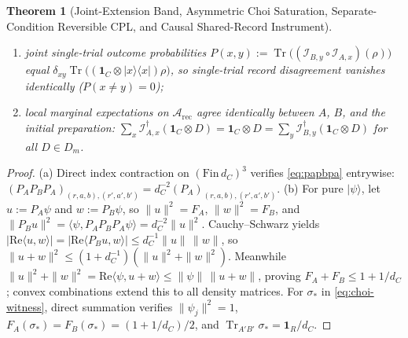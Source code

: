 \documentclass[11pt,a4paper]{article}
\newtheorem{theorem}{Theorem}
\theoremstyle{definition}
\theoremstyle{remark}
\newcommand{\Tr}{\operatorname{Tr}}
\newcommand{\cA}{\mathcal{A}}
\newcommand{\cI}{\mathcal{I}}
\newcommand{\1}{\mathbf{1}}
\begin{document}
\begin{theorem}[Joint-Extension Band, Asymmetric Choi Saturation, Separate-Condition Reversible CPL, and Causal Shared-Record Instrument]
\begin{enumerate}
\begin{enumerate}
    \item[(ii)] joint single-trial outcome probabilities $P(x,y) := \Tr\bigl((\cI_{B,y}\circ\cI_{A,x})(\rho)\bigr)$ equal $\delta_{xy}\Tr\bigl((\1_C\otimes |x\rangle\langle x|)\rho\bigr)$, so single-trial record disagreement vanishes identically ($P(x\neq y) = 0$);
    \item[(iii)] local marginal expectations on $\cA_{\mathrm{rec}}$ agree identically between $A$, $B$, and the initial preparation: $\sum_x \cI_{A,x}^\dagger(\1_C\otimes D) = \1_C\otimes D = \sum_y \cI_{B,y}^\dagger(\1_C\otimes D)$ for all $D\in D_m$.
  \end{enumerate}
\end{enumerate}
\end{theorem}

\begin{proof}
(a) Direct index contraction on $(\mathrm{Fin}\,d_C)^3$ verifies \eqref{eq:papbpa} entrywise: $(P_A P_B P_A)_{(r,a,b),(r',a',b')} = \allowbreak d_C^{-2}(P_A)_{(r,a,b),(r',a',b')}$.
(b) For pure $|\psi\rangle$, let $u := P_A\psi$ and $w := P_B\psi$, so $\|u\|^2 = F_A$, $\|w\|^2 = F_B$, and $\|P_B u\|^2 = \langle\psi, P_A P_B P_A\psi\rangle = d_C^{-2}\|u\|^2$. Cauchy--Schwarz yields $|\mathrm{Re}\langle u,w\rangle| = |\mathrm{Re}\langle P_B u, w\rangle| \le d_C^{-1}\|u\|\,\|w\|$, so $\|u+w\|^2 \le (1+d_C^{-1})(\|u\|^2+\|w\|^2)$. Meanwhile $\|u\|^2+\|w\|^2 = \mathrm{Re}\langle\psi,u+w\rangle \le \|\psi\|\,\|u+w\|$, proving $F_A+F_B \le 1 + 1/d_C$; convex combinations extend this to all density matrices. For $\sigma_*$ in \eqref{eq:choi-witness}, direct summation verifies $\|\psi_j\|^2 = 1$, $F_A(\sigma_*)=F_B(\sigma_*)=(1+1/d_C)/2$, and $\Tr_{A'B'}\sigma_* = \1_R/d_C$.

\end{proof}
\end{document}
